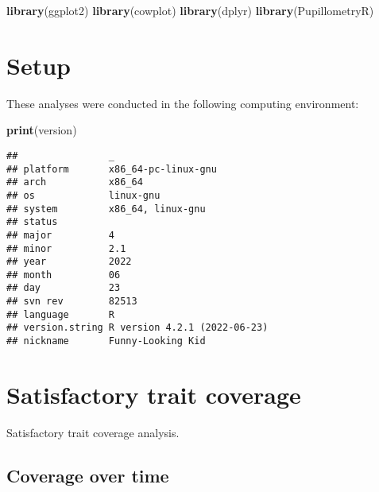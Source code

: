 \documentclass[]{book}
\newenvironment{Shaded}{\begin{snugshade}}{\end{snugshade}}
\newcommand{\KeywordTok}[1]{\textcolor[rgb]{0.13,0.29,0.53}{\textbf{#1}}}
\newcommand{\NormalTok}[1]{#1}
\begin{document}
\begin{Shaded}
\begin{Highlighting}[]
\KeywordTok{library}\NormalTok{(ggplot2)}
\KeywordTok{library}\NormalTok{(cowplot)}
\KeywordTok{library}\NormalTok{(dplyr)}
\KeywordTok{library}\NormalTok{(PupillometryR)}
\end{Highlighting}
\end{Shaded}

\hypertarget{setup-2}{%
\section{Setup}\label{setup-2}}

These analyses were conducted in the following computing environment:

\begin{Shaded}
\begin{Highlighting}[]
\KeywordTok{print}\NormalTok{(version)}
\end{Highlighting}
\end{Shaded}

\begin{verbatim}
##                _                           
## platform       x86_64-pc-linux-gnu         
## arch           x86_64                      
## os             linux-gnu                   
## system         x86_64, linux-gnu           
## status                                     
## major          4                           
## minor          2.1                         
## year           2022                        
## month          06                          
## day            23                          
## svn rev        82513                       
## language       R                           
## version.string R version 4.2.1 (2022-06-23)
## nickname       Funny-Looking Kid
\end{verbatim}

\hypertarget{satisfactory-trait-coverage}{%
\section{Satisfactory trait coverage}\label{satisfactory-trait-coverage}}

Satisfactory trait coverage analysis.

\hypertarget{coverage-over-time}{%
\subsection{Coverage over time}\label{coverage-over-time}}
\end{document}
